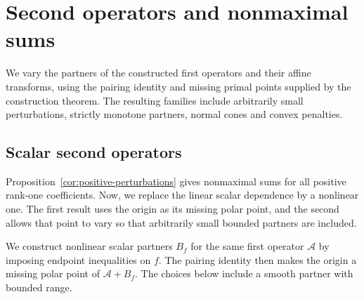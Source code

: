 \documentclass[11pt]{article}
\theoremstyle{definition}
\theoremstyle{remark}
\begin{document}
\section{Second operators and nonmaximal sums}
\label{app:partners}

We vary the partners of the constructed first operators and their affine transforms, using the pairing identity and missing primal points supplied by the construction theorem. The resulting families include arbitrarily small perturbations, strictly monotone partners, normal cones and convex penalties.

\subsection{Scalar second operators}
\label{subsec:counterexample-families}

Proposition~\ref{cor:positive-perturbations} gives nonmaximal sums for all positive rank-one coefficients. Now, we replace the linear scalar dependence by a nonlinear one. The first result uses the origin as its missing polar point, and the second allows that point to vary so that arbitrarily small bounded partners are included.

We construct nonlinear scalar partners $B_f$ for the same first operator $\mathcal A$ by imposing endpoint inequalities on $f$. The pairing identity then makes the origin a missing polar point of $\mathcal A+B_f$. The choices below include a smooth partner with bounded range.
\end{document}
